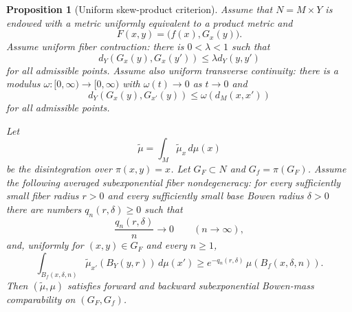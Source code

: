 \documentclass[10pt,a4paper]{amsart}
\newtheorem{proposition}{Proposition}
\begin{document}
\begin{proposition}[Uniform skew-product criterion]
\label{prop:uniform-skew-bowen}
Assume that $N=M\times Y$ is endowed with a metric uniformly equivalent to a
product metric and
\[
F(x,y)=\bigl(f(x),G_x(y)\bigr).
\]
Assume uniform fiber contraction: there is $0<\lambda<1$ such that
\[
d_Y(G_x(y),G_x(y'))\le\lambda d_Y(y,y')
\]
for all admissible points. Assume also uniform transverse continuity: there is
a modulus $\omega:[0,\infty)\to[0,\infty)$ with $\omega(t)\to0$ as $t\to0$
and
\[
d_Y(G_x(y),G_{x'}(y))\le \omega(d_M(x,x'))
\]
for all admissible points.

Let
\[
\widetilde\mu=\int_M\widetilde\mu_x\,d\mu(x)
\]
be the disintegration over $\pi(x,y)=x$. Let $G_F\subset N$ and
$G_f=\pi(G_F)$. Assume the following \emph{averaged subexponential fiber
nondegeneracy}: for every sufficiently small fiber radius $r>0$ and every
sufficiently small base Bowen radius $\delta>0$ there are numbers
$q_n(r,\delta)\ge0$ such that
\[
\frac{q_n(r,\delta)}{n}\longrightarrow0
\qquad (n\to\infty),
\]
and, uniformly for $(x,y)\in G_F$ and every $n\ge1$,
\begin{equation}
\label{eq:averaged-lower-fiber-ball-masses}
\int_{B_f(x,\delta,n)}
\widetilde\mu_{x'}(B_Y(y,r))\,d\mu(x')
\ge e^{-q_n(r,\delta)}\,\mu(B_f(x,\delta,n)).
\end{equation}
Then $(\widetilde\mu,\mu)$ satisfies forward and backward subexponential
Bowen-mass comparability on $(G_F,G_f)$.
\end{proposition}
\end{document}
